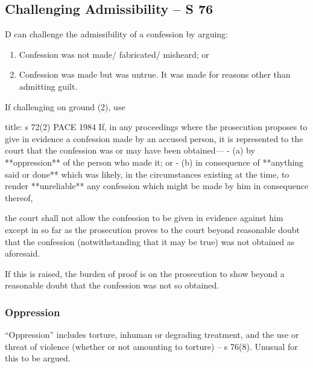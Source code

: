 \documentclass[
]{article}
\newenvironment{Shaded}{}{}
\newcommand{\NormalTok}[1]{#1}
\providecommand{\tightlist}{%
  \setlength{\itemsep}{0pt}\setlength{\parskip}{0pt}}
\begin{document}
\hypertarget{challenging-admissibility-s-76}{%
\subsection{Challenging Admissibility -- S
76}\label{challenging-admissibility-s-76}}

D can challenge the admissibility of a confession by arguing:

\begin{enumerate}
\def\labelenumi{\arabic{enumi}.}
\tightlist
\item
  Confession was not made/ fabricated/ misheard; or
\item
  Confession was made but was untrue. It was made for reasons other than
  admitting guilt.
\end{enumerate}

If challenging on ground (2), use

\begin{Shaded}
\begin{Highlighting}[]
\NormalTok{title: s 72(2) PACE 1984}
\NormalTok{If, in any proceedings where the prosecution proposes to give in evidence a confession made by an accused person, it is represented to the court that the confession was or may have been obtained—}
\NormalTok{{-} (a) by **oppression** of the person who made it; or}
\NormalTok{{-} (b) in consequence of **anything said or done** which was likely, in the circumstances existing at the time, to render **unreliable** any confession which might be made by him in consequence thereof,}

\NormalTok{the court shall not allow the confession to be given in evidence against him except in so far as the prosecution proves to the court beyond reasonable doubt that the confession (notwithstanding that it may be true) was not obtained as aforesaid. }
\end{Highlighting}
\end{Shaded}

If this is raised, the burden of proof is on the prosecution to show
beyond a reasonable doubt that the confession was not so obtained.

\hypertarget{oppression}{%
\subsubsection{Oppression}\label{oppression}}

``Oppression'' includes torture, inhuman or degrading treatment, and the
use or threat of violence (whether or not amounting to torture) -- s
76(8). Unusual for this to be argued.
\end{document}
